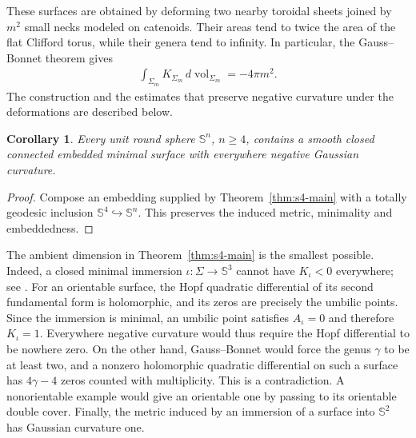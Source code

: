 \documentclass[a4paper,11pt,oneside,reqno]{amsart}
\numberwithin{equation}{section}
\newtheorem{corollary}[theorem]{Corollary}
\theoremstyle{definition}
\begin{document}
%
These surfaces are obtained by deforming two nearby toroidal sheets joined by $m^2$ small necks modeled on catenoids. Their areas tend to twice the area of the flat Clifford torus, while their genera tend to infinity. In particular, the Gauss--Bonnet theorem gives
%
\begin{align*}
    \int_{\Sigma_m}K_{\Sigma_m}\,
    d\operatorname{vol}_{\Sigma_m}=-4\pi m^2.
\end{align*}
%
The construction and the estimates that preserve negative
curvature under the deformations are described below.

\begin{corollary}
    \label{cor:s4-higher-spheres}
    Every unit round sphere $\mathbb{S}^n$, $n\geq4$, contains
    a smooth closed connected embedded minimal surface with
    everywhere negative Gaussian curvature.
\end{corollary}
\begin{proof}
    Compose an embedding supplied by Theorem~\ref{thm:s4-main}
    with a totally geodesic inclusion
    $\mathbb{S}^4\hookrightarrow\mathbb{S}^n$.
    This preserves the induced metric, minimality and
    embeddedness.
\end{proof}
%
The ambient dimension in Theorem~\ref{thm:s4-main} is the
smallest possible. Indeed, a closed minimal immersion
$\iota:\Sigma\to\mathbb{S}^3$ cannot have
$K_\iota<0$ everywhere; see
\cite[Proposition~1.5]{LawsonCompleteMinimalSurfaces}.
For an orientable surface, the Hopf quadratic differential
of its second fundamental form is holomorphic, and its
zeros are precisely the umbilic points. Since the immersion
is minimal, an umbilic point satisfies $A_\iota=0$ and
therefore $K_\iota=1$. Everywhere negative curvature would
thus require the Hopf differential to be nowhere zero.
On the other hand, Gauss--Bonnet would force the genus
$\gamma$ to be at least two, and a nonzero holomorphic
quadratic differential on such a surface has
$4\gamma-4$ zeros counted with multiplicity.
This is a contradiction. A nonorientable example would
give an orientable one by passing to its orientable double
cover. Finally, the metric induced by an immersion of a
surface into $\mathbb{S}^2$ has Gaussian curvature one.
\end{document}
